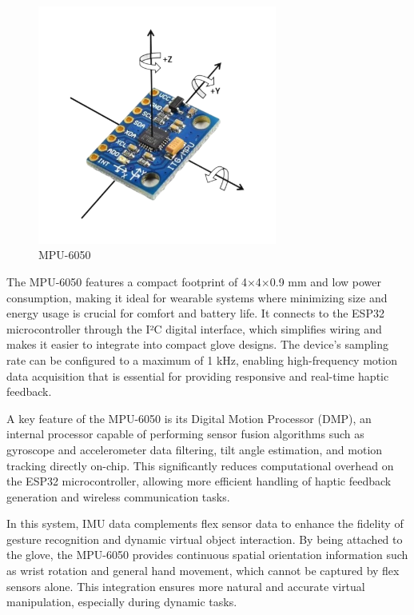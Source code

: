 \begin{figure}[H]\centering
	\includegraphics[width=0.7\textwidth]{Pictures/mpu.png}%
	\caption{MPU-6050\cite{mpu}}\label{fig:mpu}%
\end{figure}

The MPU-6050 features a compact footprint of 4×4×0.9 mm and low power consumption, making it ideal for wearable systems where minimizing size and energy usage is crucial for comfort and battery life. It connects to the ESP32 microcontroller through the I²C digital interface, which simplifies wiring and makes it easier to integrate into compact glove designs. The device's sampling rate can be configured to a maximum of 1 kHz, enabling high-frequency motion data acquisition that is essential for providing responsive and real-time haptic feedback.

A key feature of the MPU-6050 is its Digital Motion Processor (DMP), an internal processor capable of performing sensor fusion algorithms such as gyroscope and accelerometer data filtering, tilt angle estimation, and motion tracking directly on-chip. This significantly reduces computational overhead on the ESP32 microcontroller, allowing more efficient handling of haptic feedback generation and wireless communication tasks\cite{mpu6050datasheet}.

In this system, IMU data complements flex sensor data to enhance the fidelity of gesture recognition and dynamic virtual object interaction. By being attached to the glove, the MPU-6050 provides continuous spatial orientation information such as wrist rotation and general hand movement, which cannot be captured by flex sensors alone. This integration ensures more natural and accurate virtual manipulation, especially during dynamic tasks. 


